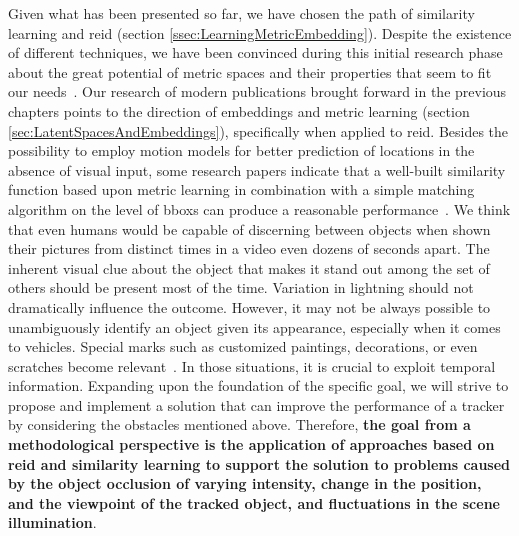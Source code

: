 Given what has been presented so far, we have chosen the path of similarity learning and \gls{reid} (section \ref{ssec:LearningMetricEmbedding}). Despite the existence of different techniques, we have been convinced during this initial research phase about the great potential of metric spaces and their properties that seem to fit our needs~\cite{Liu2016}. Our research of modern publications brought forward in the previous chapters points to the direction of embeddings and metric learning (section \ref{sec:LatentSpacesAndEmbeddings}), specifically when applied to \gls{reid}. Besides the possibility to employ motion models for better prediction of locations in the absence of visual input, some research papers indicate that a well-built similarity function based upon metric learning in combination with a simple matching algorithm on the level of \glspl{bbox} can produce a reasonable performance~\cite{Tao2016}. We think that even humans would be capable of discerning between objects when shown their pictures from distinct times in a video even dozens of seconds apart. The inherent visual clue about the object that makes it stand out among the set of others should be present most of the time. Variation in lightning should not dramatically influence the outcome. However, it may not be always possible to unambiguously identify an object given its appearance, especially when it comes to vehicles. Special marks such as customized paintings, decorations, or even scratches become relevant~\cite{Liu2016}. In those situations, it is crucial to exploit temporal information. Expanding upon the foundation of the specific goal, we will strive to propose and implement a solution that can improve the performance of a tracker by considering the obstacles mentioned above. Therefore, \textbf{the goal from a methodological perspective is the application of approaches based on \gls{reid} and similarity learning to support the solution to problems caused by the object occlusion of varying intensity, change in the position, and the viewpoint of the tracked object, and fluctuations in the scene illumination}.

